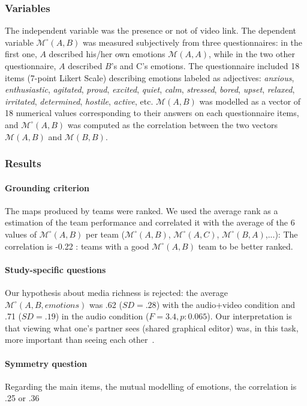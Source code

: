 \documentclass[natbib]{svjour3}
\newcommand{\gmodel}[2]{{$\mathcal{M}(#1, #2)$}}
\newcommand{\Model}[3]{{$\mathcal{M}^{\circ}(#1, #2, #3)$}}
\newcommand{\gModel}[2]{{$\mathcal{M}^{\circ}(#1, #2)$}}
\begin{document}
\subsubsection*{Variables}

The independent variable was the presence or not of video link. The dependent
variable \gModel{A}{B} was measured subjectively from three questionnaires: in the first
one, $A$ described his/her own emotions \gmodel{A}{A}, while in the two other
questionnaire, $A$ described $B$'s and C's emotions. The questionnaire included 18
items (7-point Likert Scale) describing emotions labeled as adjectives:
\emph{anxious}, \emph{enthusiastic}, \emph{agitated}, \emph{proud},
\emph{excited}, \emph{quiet}, \emph{calm}, \emph{stressed}, \emph{bored},
\emph{upset}, \emph{relaxed}, \emph{irritated}, \emph{determined},
\emph{hostile}, \emph{active}, etc. \gmodel{A}{B} was modelled as a vector
of 18 numerical values corresponding to their answers on each
questionnaire items, and \gModel{A}{B} was computed as the correlation between the
two vectors \gmodel{A}{B} and \gmodel{B}{B}.

\subsubsection*{Results}

\paragraph{Grounding criterion} The maps produced by teams were
ranked. We used
the average rank as a estimation of the team performance and correlated it with the
average of the 6 values of \gModel{A}{B} per team (\gModel{A}{B}, \gModel{A}{C},
\gModel{B}{A},...): The correlation is -0.22 : teams with a good \gModel{A}{B}
team to be better ranked. 

\paragraph{Study-specific questions} Our hypothesis about media richness is
rejected: the average \Model{A}{B}{emotions} was .62 ($SD = .28$) with the
audio+video condition and .71 ($SD = .19$) in the audio condition ($F=3.4, p:
0.065$). Our interpretation is that viewing what one's partner sees (shared
graphical editor) was, in this task, more important than seeing each
other~\citep{gaver1993one,anderson1997impact}.

\paragraph{Symmetry question} Regarding the main items, the mutual modelling of
emotions, the correlation is .25 or .36  
\end{document}
